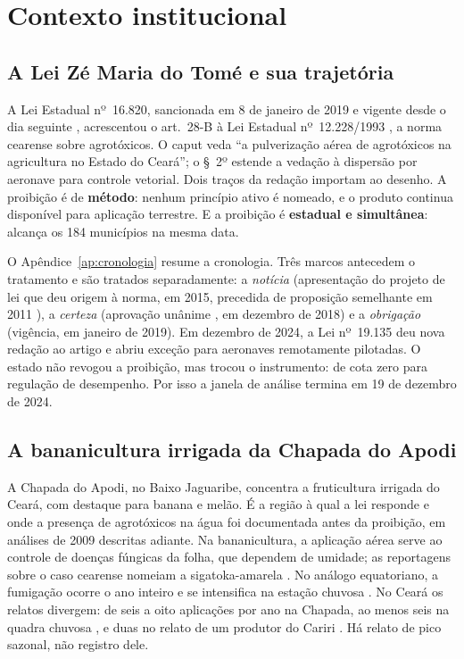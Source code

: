 
\chapter{Contexto institucional}
\label{cap:contexto}

\section{A Lei Zé Maria do Tomé e sua trajetória}

A Lei Estadual nº~16.820, sancionada em 8 de janeiro de 2019 e vigente desde o
dia seguinte \cite{ceara2019lei16820}, acrescentou o art.~28-B à Lei Estadual
nº~12.228/1993 \cite{ceara1993lei12228}, a norma cearense sobre agrotóxicos. O caput veda ``a pulverização aérea de agrotóxicos
na agricultura no Estado do Ceará''; o §~2º estende a vedação à dispersão por
aeronave para controle vetorial. Dois traços da redação importam ao desenho. A
proibição é de \textbf{método}: nenhum princípio ativo é nomeado, e o produto
continua disponível para aplicação terrestre. E a proibição é \textbf{estadual
e simultânea}: alcança os 184 municípios na mesma data.

O Apêndice~\ref{ap:cronologia} resume a cronologia. Três marcos antecedem o
tratamento e são tratados separadamente: a \emph{notícia} (apresentação do projeto de lei que deu origem à norma, em
2015, precedida de proposição semelhante em 2011 \cite{ceara2011pl134}), a \emph{certeza} (aprovação unânime \cite{lavor2019antes}, em dezembro de
2018) e a \emph{obrigação} (vigência, em janeiro de 2019). Em dezembro de 2024,
a Lei nº~19.135 \cite{ceara2024lei19135} deu nova redação ao artigo e abriu exceção para aeronaves
remotamente pilotadas. O estado não revogou a proibição, mas trocou o
instrumento: de cota zero para regulação de desempenho. Por isso a janela de
análise termina em 19 de dezembro de 2024.


\section{A bananicultura irrigada da Chapada do Apodi}

A Chapada do Apodi, no Baixo Jaguaribe, concentra a fruticultura irrigada do
Ceará, com destaque para banana e melão. É a região à qual a lei responde e
onde a presença de agrotóxicos na água foi documentada antes da proibição,
em análises de 2009 descritas adiante. Na
bananicultura, a aplicação aérea serve ao controle de doenças fúngicas da
folha, que dependem de umidade; as reportagens sobre o caso cearense nomeiam a
sigatoka-amarela \cite{agenciabrasil2016ceara,globorural2021bananais}. No
análogo equatoriano, a fumigação ocorre o ano inteiro e se intensifica na
estação chuvosa \cite{calzada2023bananas}. No Ceará os relatos divergem: de seis
a oito aplicações por ano na Chapada, ao menos seis na quadra chuvosa
\cite[p.~69 e 152]{carneiro2015dossie}, e duas no relato de um produtor do Cariri
\cite{globorural2021bananais}. Há relato de pico sazonal, não registro dele.

